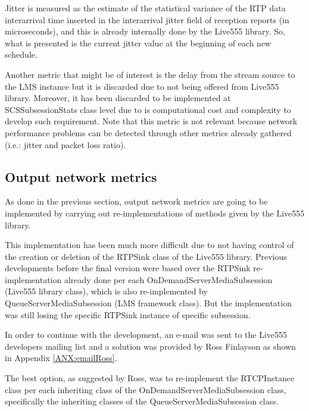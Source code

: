 Jitter is measured as the estimate of the statistical variance of the RTP data interarrival time inserted in the interarrival jitter field of reception reports (in microseconds), and this is already internally done by the Live555 library. So, what is presented is the current jitter value at the beginning of each new schedule.

Another metric that might be of interest is the delay from the stream source to the LMS instance but it is discarded due to not being offered from Live555 library. Moreover, it has been discarded to be implemented at SCSSubsessionStats class level due to is computational cost and complexity to develop such requirement. Note that this metric is not relevant because network performance problems can be detected through other metrics already gathered (i.e.: jitter and packet loss ratio).


\subsection{Output network metrics}

As done in the previous section, output network metrics are going to be implemented by carrying out re-implementations of methods given by the Live555 library.

This implementation has been much more difficult due to not having control of the creation or deletion of the RTPSink class of the Live555 library. Previous developments before the final version were based over the RTPSink re-implementation already done per each OnDemandServerMediaSubsession (Live555 library class), which is also re-implemented by QueueServerMediaSubsession (LMS framework class). But the implementation was still losing the specific RTPSink instance of specific subsession.

In order to continue with the development, an e-mail was sent to the Live555 developers mailing list and a solution was provided by Ross Finlayson as shown in Appendix \ref{ANX:emailRoss}.

The best option, as suggested by Ross, was to re-implement the RTCPInstance class per each inheriting class of the OnDemandServerMediaSubsession class, specifically the inheriting classes of the QueueServerMediaSubsession class. 

